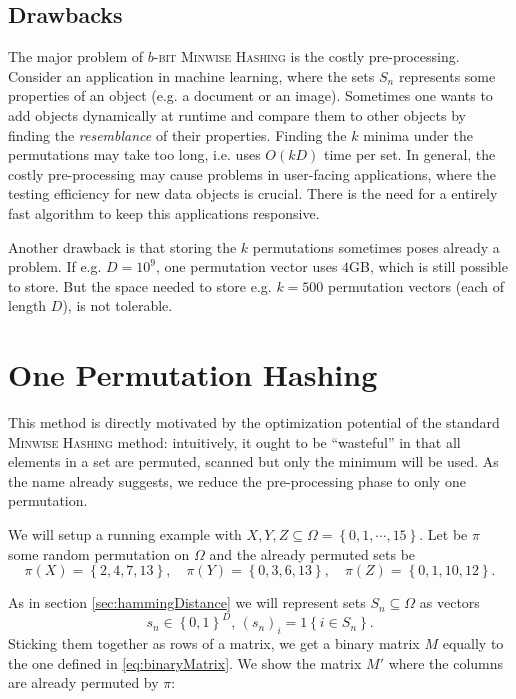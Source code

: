 \documentclass[a4paper]{article}
\begin{document}
\subsection{Drawbacks} \label{sec:b-bitDrawbacks}

The major problem of \textsc{$b$-bit Minwise Hashing} is the costly pre-processing. Consider an application in machine learning, where the sets $S_n$ represents some properties of an object (e.g. a document or an image). Sometimes one wants to add objects dynamically at runtime and compare them to other objects by finding the \emph{resemblance} of their properties. Finding the $k$ minima under the permutations may take too long, i.e. uses $O(kD)$ time per set.
In general, the costly pre-processing may cause problems in user-facing applications, where the testing efficiency for new data objects is crucial. There is the need for a entirely fast algorithm to keep this applications responsive.

Another drawback is that storing the $k$ permutations sometimes poses already a problem. If e.g. $D=10^9$, one permutation vector uses $4$GB, which is still possible to store. But the space needed to store e.g. $k=500$ permutation vectors (each of length $D$), is not tolerable.



\section{One Permutation Hashing}

This method is directly motivated by the optimization potential of the standard \textsc{Minwise Hashing} method: intuitively, it ought to be ``wasteful'' in that all elements in a set are permuted, scanned but only the minimum will be used. As the name already suggests, we reduce the pre-processing phase to only one permutation.

We will setup a running example with $X,Y,Z \subseteq \Omega = \left\lbrace 0,1,\cdots,15\right\rbrace$. Let be $\pi$ some random permutation on $\Omega$ and the already permuted sets be
\[
\pi(X)=\left\lbrace 2,4,7,13\right\rbrace, \quad \pi(Y)=\left\lbrace 0,3,6,13\right\rbrace,\quad \pi(Z)= \left\lbrace 0,1,10,12\right\rbrace.
\]

As in section \vref{sec:hammingDistance} we will represent sets $S_n \subseteq \Omega$ as vectors
\begin{equation*}
s_n \in \left\lbrace 0,1 \right\rbrace ^D, \, (s_n)_i = 1\left\lbrace i \in S_n \right\rbrace .
\end{equation*}
Sticking them together as rows of a matrix, we get a binary matrix $M$ equally to the one defined in \vref{eq:binaryMatrix}. We show the matrix $M'$ where the columns are already permuted by $\pi$:
\end{document}
